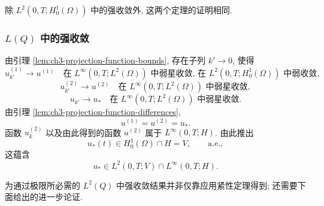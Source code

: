 \hypertarget{chapter-03-page-288}{}
除 $L^2(0,T;H_0^1(\Omega))$ 中的强收敛外, 这两个定理的证明相同.

\subsubsection{$L(Q)$ 中的强收敛}
\label{subsubsec:ch3-projection-strong-lq}

由引理 \ref{lem:ch3-projection-function-bounds}, 存在子列 $k'\to0$, 使得
\begin{equation}
u_{k'}^{(1)}\longrightarrow u^{(1)}
\quad\text{在 }L^\infty(0,T;L^2(\Omega))\text{ 中弱星收敛,
在 }L^2(0,T;H_0^1(\Omega))\text{ 中弱收敛},
\label{eq:ch3-projection-subsequence-u1}
\end{equation}
\begin{equation}
u_{k'}^{(2)}\longrightarrow u^{(2)}
\quad\text{在 }L^\infty(0,T;L^2(\Omega))\text{ 中弱星收敛},
\label{eq:ch3-projection-subsequence-u2}
\end{equation}
\begin{equation}
u_{k'}\longrightarrow u_*
\quad\text{在 }L^\infty(0,T;L^2(\Omega))\text{ 中弱星收敛}.
\label{eq:ch3-projection-subsequence-uk}
\end{equation}
由引理 \ref{lem:ch3-projection-function-differences},
\begin{equation}
u^{(1)}=u^{(2)}=u_*.
\label{eq:ch3-projection-common-limit}
\end{equation}
函数 $u_k^{(2)}$ 以及由此得到的函数 $u^{(2)}$ 属于 $L^\infty(0,T;H)$. 由此推出
\[
u_*(t)\in H_0^1(\Omega)\cap H=V,\qquad\text{a.e.},
\]
这蕴含
\begin{equation}
u_*\in L^2(0,T;V)\cap L^\infty(0,T;H).
\label{eq:ch3-projection-limit-space}
\end{equation}

为通过极限所必需的 $L^2(Q)$ 中强收敛结果并非仅靠应用紧性定理得到; 还需要下面给出的进一步论证.

